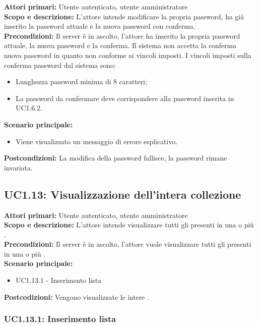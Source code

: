 \documentclass{scalatekids-article}
\begin{document}
\textbf{Attori primari:} Utente autenticato, utente amministratore\\
\textbf{Scopo e descrizione:} L'attore intende modificare la propria password, ha già inserito la password attuale e la nuova password con conferma.\\
\textbf{Precondizioni:} Il server è in ascolto, l'attore ha inserito la propria password attuale, la nuova password e la conferma. Il sistema non accetta la conferma nuova password in quanto non conforme ai
vincoli imposti. I vincoli imposti sulla conferma password dal sistema sono:
\begin{itemize}
\item Lunghezza password minima di 8 caratteri;
\item La password da confermare deve corrispondere alla password inserita in UC1.6.2.
\end{itemize}
\textbf{Scenario principale:}
\begin{itemize}
\item Viene visualizzato un messaggio di errore esplicativo.
\end{itemize}
\textbf{Postcondizioni:} La modifica della password fallisce, la password rimane invariata.

\subsection{UC1.13: Visualizzazione dell'intera collezione}

\textbf{Attori primari:} Utente autenticato, utente amministratore\\
\textbf{Scopo e descrizione:} L'attore intende visualizzare tutti gli  presenti in una o più .\\
\textbf{Precondizioni:} Il server è in ascolto, l'attore vuole visualizzare tutti gli  presenti in una o più .\\
\textbf{Scenario principale:}
\begin{itemize}
\item UC1.13.1 - Inserimento lista 
\end{itemize}
\textbf{Postcodizioni:} Vengono visualizzate le intere .

\subsubsection{UC1.13.1: Inserimento lista }
\end{document}
